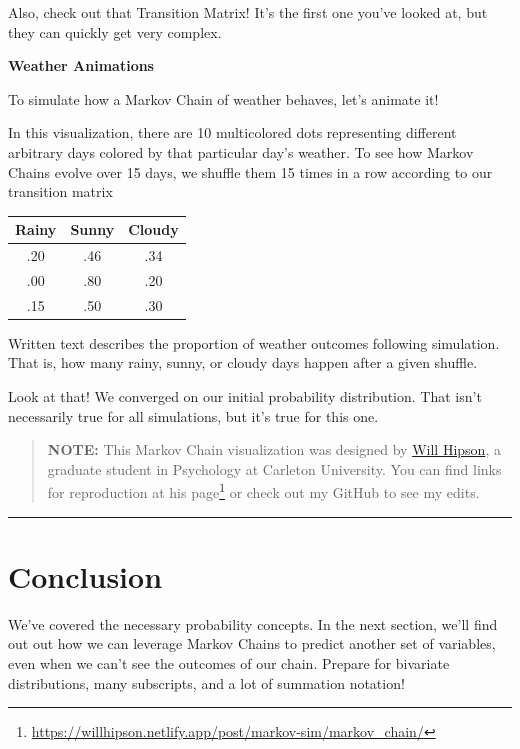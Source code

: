 \documentclass[
]{book}
\begin{document}
Also, check out that Transition Matrix! It's the first one you've looked at, but they can quickly get very complex.

\hfill\break

\textbf{Weather Animations}

To simulate how a Markov Chain of weather behaves, let's animate it!

In this visualization, there are 10 multicolored dots representing different arbitrary days colored by that particular day's weather. To see how Markov Chains evolve over 15 days, we shuffle them 15 times in a row according to our transition matrix

\begin{longtable}[]{@{}ccc@{}}
\toprule\noalign{}
Rainy & Sunny & Cloudy \\
\midrule\noalign{}
\endhead
\bottomrule\noalign{}
\endlastfoot
.20 & .46 & .34 \\
.00 & .80 & .20 \\
.15 & .50 & .30 \\
\end{longtable}

Written text describes the proportion of weather outcomes following simulation. That is, how many rainy, sunny, or cloudy days happen after a given shuffle.

Look at that! We converged on our initial probability distribution. That isn't necessarily true for all simulations, but it's true for this one.

\begin{quote}
\textbf{NOTE:} This Markov Chain visualization was designed by \href{https://willhipson.netlify.app}{Will Hipson}, a graduate student in Psychology at Carleton University. You can find links for reproduction at his page\footnote{\url{https://willhipson.netlify.app/post/markov-sim/markov_chain/}} or check out my GitHub to see my edits.
\end{quote}

\hfill\break

\begin{center}\rule{0.5\linewidth}{0.5pt}\end{center}

\hypertarget{conclusion}{%
\section{Conclusion}\label{conclusion}}

We've covered the necessary probability concepts. In the next section, we'll find out out how we can leverage Markov Chains to predict another set of variables, even when we can't see the outcomes of our chain. Prepare for bivariate distributions, many subscripts, and a lot of summation notation!
\end{document}
